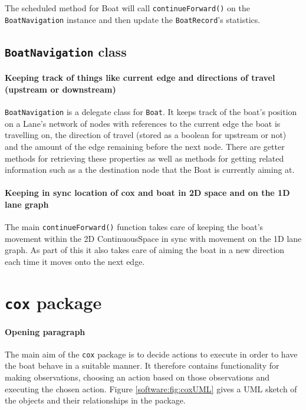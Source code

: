 The scheduled method for Boat will call \texttt{continueForward()} on the
\texttt{BoatNavigation} instance and then update the \texttt{BoatRecord}'s statistics.

\subsection{\texttt{BoatNavigation} class}
\paragraph{Keeping track of things like current edge and
directions of travel (upstream or downstream)}
\texttt{BoatNavigation} is a delegate class for \texttt{Boat}. It keeps track of the
boat's position on a Lane's network of nodes with references to the
current edge the boat is travelling on, the direction of travel
(stored as a boolean for upstream or not) and the amount of the edge
remaining before the next node. There are getter methods for
retrieving these properties as well as methods for getting related
information such as a the destination node that the Boat is currently
aiming at.

\paragraph{Keeping in sync location of cox and boat in 2D space and on the 1D lane graph}
The main \texttt{continueForward()} function takes care of keeping the
boat's movement within the 2D ContinuousSpace in sync with
movement on the 1D lane graph. As part of this it also takes care of
aiming the boat in a new direction each time it moves onto the next
edge.



\section{\texttt{cox} package}
\paragraph{Opening paragraph}
The main aim of the \texttt{cox} package is to decide actions to execute in order to have the boat behave in a suitable manner. It therefore contains functionality for making observations, choosing an action based on those observations and executing the chosen action. Figure \ref{software:fig:coxUML} gives a UML sketch of the objects and their relationships in the package.

